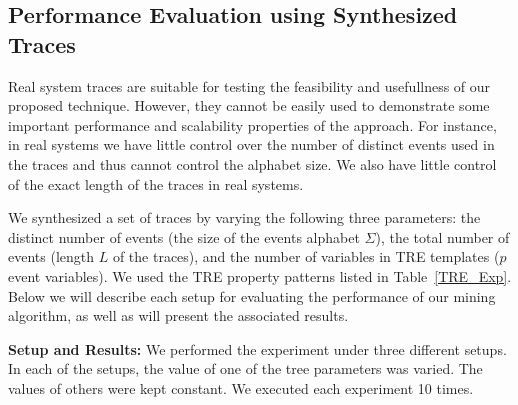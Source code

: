\documentclass[]{sigplanconf}
\begin{document}
\begin{table}[ht]
  \caption{Mining TREs on CAN Traces} \label{TRE-CAN}
\end{table}

\subsection{Performance Evaluation using Synthesized Traces}

Real system traces are suitable for testing the feasibility and usefullness of our proposed technique. However, they cannot be easily used to demonstrate some important performance and scalability properties of the approach. For instance, in real systems we have little control over the number of distinct events used in the traces and thus cannot control the alphabet size. We also have little control of the exact length of the traces in real systems.


We synthesized a set of traces by varying the following three parameters: the distinct number of events (the size of the events alphabet $\Sigma$), the total number of events (length $L$ of the traces), and the number of variables in TRE templates ($p$ event variables). We used the TRE property patterns listed in Table~\ref{TRE_Exp}.
Below we will describe each setup for evaluating the performance of our mining algorithm, as well as will present the associated results.

\vspace{3mm}

\noindent \textbf{Setup and Results:} We performed the experiment under three different setups. In each of the setups, the value of one of the tree parameters was varied. The values of others were kept constant. We executed each experiment 10 times.
\end{document}
